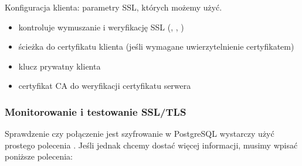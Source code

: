 \documentclass[letterpaper,10pt,polish]{sphinxmanual}
\begin{document}
\begin{sphinxVerbatim}[commandchars=\\\{\}]
    
      
          
\end{sphinxVerbatim}

\sphinxAtStartPar
Konfiguracja klienta: parametry SSL, których możemy użyć.
\begin{itemize}
\item {} 
\sphinxAtStartPar
{} \sphinxhyphen{} kontroluje wymuszanie i weryfikację SSL (, , )

\item {} 
\sphinxAtStartPar
{} \sphinxhyphen{} ścieżka do certyfikatu klienta (jeśli wymagane uwierzytelnienie certyfikatem)

\item {} 
\sphinxAtStartPar
{} \sphinxhyphen{}  klucz prywatny klienta

\item {} 
\sphinxAtStartPar
{} \sphinxhyphen{} certyfikat CA do weryfikacji certyfikatu serwera

\end{itemize}


\subsubsection{Monitorowanie i testowanie SSL/TLS}
\label{\detokenize{rozdzial2/bezpieczenstwo/index:monitorowanie-i-testowanie-ssl-tls}}
\sphinxAtStartPar
Sprawdzenie czy połączenie jest szyfrowanie w PostgreSQL wystarczy użyć prostego polecenia . Jeśli jednak chcemy dostać więcej informacji, musimy wpisać poniższe polecenia:
\end{document}
